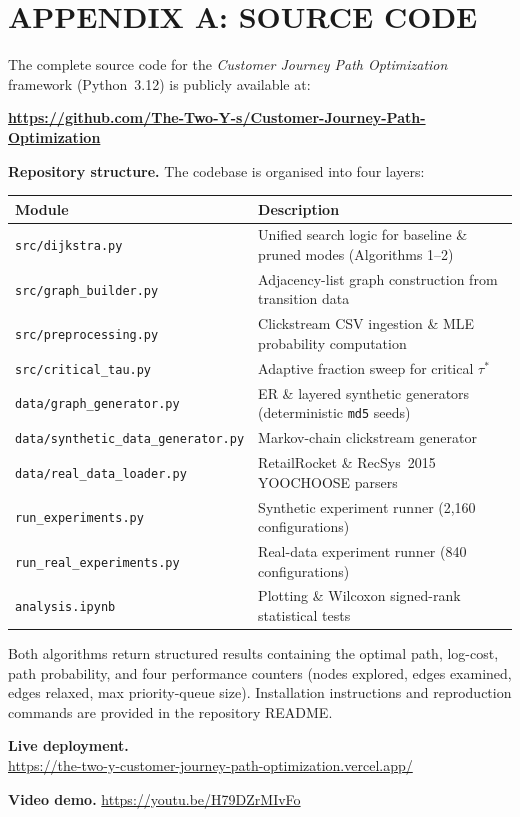 \chapter*{APPENDIX A: SOURCE CODE}

\noindent\begin{sloppypar}The complete source code for the \textit{Customer Journey Path Optimization} framework (Python~3.12) is publicly available at:\end{sloppypar}

\smallskip
\noindent\centerline{\textbf{\url{https://github.com/The-Two-Y-s/Customer-Journey-Path-Optimization}}}

\smallskip
\noindent\textbf{Repository structure.}
The codebase is organised into four layers:

\begin{table}[h!]
\centering\footnotesize
\renewcommand{\arraystretch}{1.15}
\begin{tabular}{@{}lp{}@{}}
\toprule
\textbf{Module} & \textbf{Description} \\
\midrule
\texttt{src/dijkstra.py}            & Unified search logic for baseline \& pruned modes (Algorithms 1--2) \\
\texttt{src/graph\_builder.py}       & Adjacency-list graph construction from transition data \\
\texttt{src/preprocessing.py}       & Clickstream CSV ingestion \& MLE probability computation \\
\texttt{src/critical\_tau.py}        & Adaptive fraction sweep for critical $\tau^*$ \\
\texttt{data/graph\_generator.py}    & ER \& layered synthetic generators (deterministic \texttt{md5} seeds) \\
\texttt{data/synthetic\_data\_generator.py} & Markov-chain clickstream generator \\
\texttt{data/real\_data\_loader.py}   & RetailRocket \& RecSys~2015 YOOCHOOSE parsers \\
\texttt{run\_experiments.py}         & Synthetic experiment runner (2,160 configurations) \\
\texttt{run\_real\_experiments.py}    & Real-data experiment runner (840 configurations) \\
\texttt{analysis.ipynb}             & Plotting \& Wilcoxon signed-rank statistical tests \\
\bottomrule
\end{tabular}
\end{table}

\noindent Both algorithms return structured results containing the optimal path, log-cost, path probability, and four performance counters (nodes explored, edges examined, edges relaxed, max priority-queue size). Installation instructions and reproduction commands are provided in the repository README.

\medskip
\noindent\textbf{Live deployment.}\\{\small\url{https://the-two-y-customer-journey-path-optimization.vercel.app/}}

\noindent\textbf{Video demo.} \url{https://youtu.be/H79DZrMIvFo}
